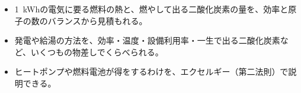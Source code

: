 \makeatletter
\newcommand\qxqbar[5]{%
  \node[font=\sffamily\footnotesize, anchor=east, inner sep=1pt] at (-1.5,#1) {#2};
  \fill[#4] (0,#1-2.2) rectangle (#3,#1+2.2);
  \node[font=\sffamily\footnotesize, anchor=west, inner sep=1pt] at (#3+1.2,#1) {#5};}
\makeatother
{}


\begin{goal}
\begin{itemize}[label={\color{bkTheme}●}, leftmargin=1.6\zw, itemsep=0pt, topsep=1pt]
\item {}\enspace \qty{1}{kWh}の電気に要る燃料の熱と、燃やして出る二酸化炭素の量を、効率と原子の数のバランスから見積もれる。
\item {}\enspace 発電や給湯の方法を、効率・温度・設備利用率・一生で出る二酸化炭素など、いくつもの物差しでくらべられる。
\item {}\enspace ヒートポンプや燃料電池が得をするわけを、エクセルギー（第二法則）で説明できる。
\end{itemize}
\end{goal}

